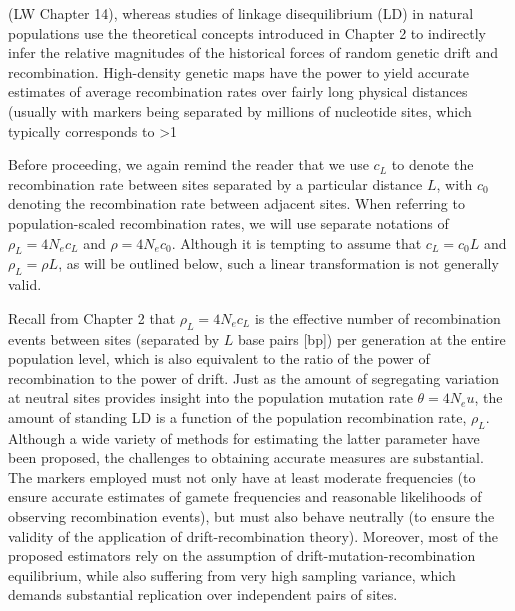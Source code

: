 \documentclass{article}
\begin{document}
(LW Chapter 14), whereas studies of linkage disequilibrium (LD) in natural populations use the theoretical concepts introduced in Chapter 2 to indirectly infer the relative magnitudes of the historical forces of random genetic drift and recombination. High-density genetic maps have the power to yield accurate estimates of average recombination rates over fairly long physical distances (usually with markers being separated by millions of nucleotide sites, which typically corresponds to >1%

Before proceeding, we again remind the reader that we use  $ c_L $ to denote the recombination rate between sites separated by a particular distance  $ L $, with  $ c_0 $ denoting the recombination rate between adjacent sites. When referring to population-scaled recombination rates, we will use separate notations of  $ \rho_L = 4N_e c_L $ and  $ \rho = 4N_e c_0 $. Although it is tempting to assume that  $ c_L = c_0 L $ and  $ \rho_L = \rho L $, as will be outlined below, such a linear transformation is not generally valid.

Recall from Chapter 2 that  $ \rho_L = 4N_e c_L $ is the effective number of recombination events between sites (separated by  $ L $ base pairs [bp]) per generation at the entire population level, which is also equivalent to the ratio of the power of recombination to the power of drift. Just as the amount of segregating variation at neutral sites provides insight into the population mutation rate  $ \theta = 4N_e u $, the amount of standing LD is a function of the population recombination rate,  $ \rho_L $. Although a wide variety of methods for estimating the latter parameter have been proposed, the challenges to obtaining accurate measures are substantial. The markers employed must not only have at least moderate frequencies (to ensure accurate estimates of gamete frequencies and reasonable likelihoods of observing recombination events), but must also behave neutrally (to ensure the validity of the application of drift-recombination theory). Moreover, most of the proposed estimators rely on the assumption of drift-mutation-recombination equilibrium, while also suffering from very high sampling variance, which demands substantial replication over independent pairs of sites.
\end{document}
